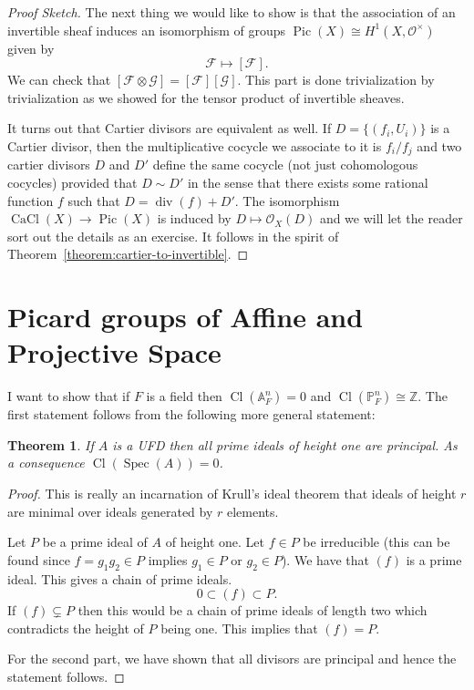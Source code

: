 \documentclass[12pt]{article}
\numberwithin{equation}{section}
\newtheorem{theorem}{Theorem}[subsection]
\theoremstyle{definition}
\theoremstyle{remark}
\newcommand{\ZZ}{\mathbb{Z}}
\newcommand{\Ocal}{\mathcal{O}}
\newcommand{\PP}{\mathbb{P}}
\renewcommand{\AA}{\mathbb{A}}
\newcommand{\Spec}{\operatorname{Spec}}
\newcommand{\CaCl}{\operatorname{CaCl}}
\newcommand{\Pic}{\operatorname{Pic}}
\renewcommand{\div}{\operatorname{div}}
\newcommand{\Cl}{\operatorname{Cl}}
\begin{document}
\begin{proof}[Proof Sketch]
	The next thing we would like to show is that the association of an invertible sheaf induces an isomorphism of groups $\Pic(X) \cong H^1(X,\mathcal O^{\times})$ given by
	$$ \mathcal F \mapsto [\mathcal F].$$ 
	We can check that $[\mathcal F\otimes\mathcal G] = [\mathcal F][\mathcal G]$.
	This part is done trivialization by trivialization as we showed for the tensor product of invertible sheaves.
	
	It turns out that Cartier divisors are equivalent as well. 
	If $D= \lbrace (f_i,U_i) \rbrace$ is a Cartier divisor, then the multiplicative cocycle we associate to it is $f_i/f_j$ and two cartier divisors $D$ and $D'$ define the same cocycle (not just cohomologous cocycles) provided that $D\sim D'$ in the sense that there exists some rational function $f$ such that $D= \div(f) + D'$.
	The isomorphism $\CaCl(X) \to \Pic(X)$ is induced by $D \mapsto \Ocal_X(D)$ and we will let the reader sort out the details as an exercise. 
	It follows in the spirit of Theorem~\ref{theorem:cartier-to-invertible}.
\end{proof}

\section{Picard groups of Affine and Projective Space}

I want to show that if $F$ is a field then $\Cl(\AA^n_F)=0$ and  $\Cl(\PP^n_F)\cong \ZZ$. 
The first statement follows from the following more general statement:
\begin{theorem}
	If $A$ is a UFD then all prime ideals of height one are principal. As a consequence $\Cl(\Spec(A))=0$.
\end{theorem}
\begin{proof}
	This is really an incarnation of Krull's ideal theorem that ideals of height $r$ are minimal over ideals generated by $r$ elements.
	
	Let $P$ be a prime ideal of $A$ of height one. 
	Let $f \in P$ be irreducible (this can be found since $f=g_1g_2\in P$ implies $g_1\in P$ or $g_2\in P$). 
	We have that $(f)$ is a prime ideal. 
	This gives a chain of prime ideals.
	 $$ 0 \subset (f) \subset P. $$
	If $(f)\subsetneq P$ then this would be a chain of prime ideals of length two which contradicts the height of $P$ being one. 
	This implies that $(f) = P$.
	
	For the second part, we have shown that all divisors are principal and hence the statement follows.
\end{proof}
\end{document}
